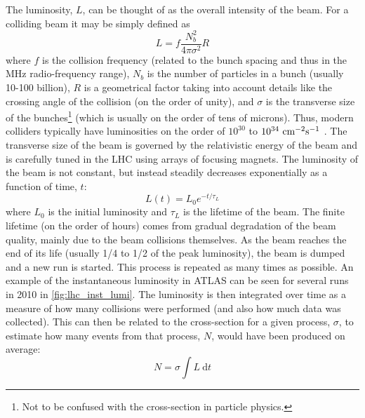 The luminosity, $L$,  can be thought of as the overall intensity of the beam.
For a colliding beam it may be simply defined as
\begin{equation}
L=f \frac{N_b^2}{4\pi\sigma^2} R
\end{equation}
where $f$ is the collision frequency (related to the bunch spacing and thus
in the MHz radio-frequency range), 
$N_b$ is the number of particles in a bunch (usually 10-100 billion), 
$R$ is a  geometrical factor
taking into account details like the crossing angle of the collision (on the
order of unity),
and $\sigma$ is the transverse size of the bunches\footnote{Not to be confused
with the cross-section in particle physics.} (which 
is usually on the order of tens of microns).
Thus, modern colliders typically have luminosities on the order of 
$10^{30}$ to $10^{34}~\textrm{cm}^{-2}\textrm{s}^{-1}$ \cite{PDG:2014}.
The transverse size of the beam is governed by the relativistic 
energy of the beam and is carefully tuned in the LHC
using arrays of focusing magnets. 
The luminosity of the beam is not constant, but instead steadily decreases
exponentially as a function of time, $t$:
\begin{equation}
L(t) = L_0 e^{-t/\tau_L} 
\label{eq:lhc_lumi}
\end{equation}
where $L_0$ is the initial luminosity and $\tau_L$ is the lifetime of the 
beam. The finite lifetime (on the order of hours) comes from gradual 
degradation of the beam quality, mainly due to the beam collisions themselves.
As the beam reaches the end of its 
life (usually 1/4 to 1/2 of the peak luminosity), the beam is dumped and a new
run is started. This process is repeated as many times as possible. 
An example of the instantaneous luminosity in ATLAS can be seen for
several runs in 2010 in \fig\ref{fig:lhc_inst_lumi}.
The luminosity is then integrated over time as a measure of how many collisions
were performed (and also how much data was collected).  This can
then be related to the cross-section for a given process, $\sigma$, to estimate
how many events from that process, $N$, would have been produced on average:
\begin{equation}
N=\sigma \int L~ \textrm{d}t
\end{equation}

